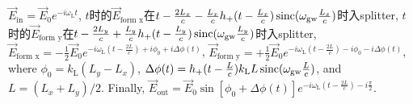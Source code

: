 $\vec{E}_\text{in}=\vec{E}_0e^{-i\omega_\text{L}t}$, $t$时的$\vec{E}_\text{form x}$在$t-\frac{2L_x}{c}-\frac{L_x}{c}h_+(t-\frac{L_x}{c})\operatorname{sinc}(\omega_\text{gw}\frac{L_x}{c})$时入splitter, $t$时的$\vec{E}_\text{form y}$在$t-\frac{2L_y}{c}+\frac{L_y}{c}h_+(t-\frac{L_y}{c})\operatorname{sinc}(\omega_\text{gw}\frac{L_y}{c})$时入splitter, $\vec{E}_\text{form x}=-\frac{1}{2}\vec{E}_0e^{-i\omega_\text{L}(t-\frac{2L}{c})+i\phi_0+i\Delta\phi(t)}$, $\vec{E}_\text{form y}=+\frac{1}{2}\vec{E}_0e^{-i\omega_\text{L}(t-\frac{2L}{c})-i\phi_0-i\Delta\phi(t)}$, where $\phi_0=k_\text{L}(L_y-L_x)$, $\Delta\phi(t)=h_+(t-\frac{L}{c})k_\text{L}L\operatorname{sinc}(\omega_\text{gw}\frac{L}{c})$, and $L=(L_x+L_y)/2$. Finally, $\vec{E}_\text{out}=\vec{E}_0\sin[\phi_0+\Delta\phi(t)]e^{-i\omega_\text{L}(t-\frac{2L}{c})-i\frac{\pi}{2}}$.
